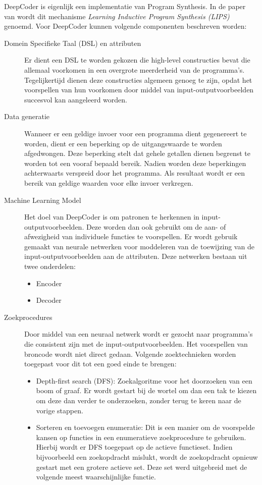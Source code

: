DeepCoder is eigenlijk een implementatie van Program Synthesis. In de paper van \textcite{deepcoderpaper} wordt dit mechanisme \textit{Learning Inductive Program Synthesis (LIPS)} genoemd. Voor DeepCoder kunnen volgende componenten beschreven worden:
\begin{description}
	\item[Domein Specifieke Taal (DSL) en attributen] Er dient een DSL te worden gekozen die high-level constructies bevat die allemaal voorkomen in een overgrote meerderheid van de programma's. Tegelijkertijd dienen deze constructies algemeen genoeg te zijn, opdat het voorspellen van hun voorkomen door middel van input-outputvoorbeelden succesvol kan aangeleerd worden.
	\item[Data generatie] Wanneer er een geldige invoer voor een programma dient gegenereert te worden, dient er een beperking op de uitgangswaarde te worden afgedwongen. Deze beperking stelt dat gehele getallen dienen begrenst te worden tot een vooraf bepaald bereik. Nadien worden deze beperkingen achterwaarts verspreid door het programma. Als resultaat wordt er een bereik van geldige waarden voor elke invoer verkregen.
	\item[Machine Learning Model] Het doel van DeepCoder is om patronen te herkennen in input-outputvoorbeelden. Deze worden dan ook gebruikt om de aan- of afwezigheid van individuele functies te voorspellen. Er wordt gebruik gemaakt van neurale netwerken voor moddeleren van de toewijzing van de input-outputvoorbeelden aan de attributen. Deze netwerken bestaan uit twee onderdelen:
	\begin{itemize}
		\item Encoder
		\item Decoder
	\end{itemize}
	\item[Zoekprocedures] Door middel van een neuraal netwerk wordt er gezocht naar programma's die consistent zijn met de input-outputvoorbeelden. Het voorspellen van broncode wordt niet direct gedaan. Volgende zoektechnieken worden toegepast voor dit tot een goed einde te brengen:
	\begin{itemize}
		\item Depth-first search (DFS): Zoekalgoritme voor het doorzoeken van een boom of graaf. Er wordt gestart bij de wortel om dan een tak te kiezen om deze dan verder te onderzoeken, zonder terug te keren naar de vorige stappen.
		\item Sorteren en toevoegen enumeratie:  Dit is een manier om de voorspelde kansen op functies in een enumeratieve zoekprocedure te gebruiken. Hierbij wordt er DFS toegepast op de actieve functieset. Indien bijvoorbeeld een zoekopdracht mislukt, wordt de zoekopdracht opnieuw gestart met een grotere actieve set. Deze set werd uitgebreid met de volgende meest waarschijnlijke functie.

\end{itemize}
\end{description}
